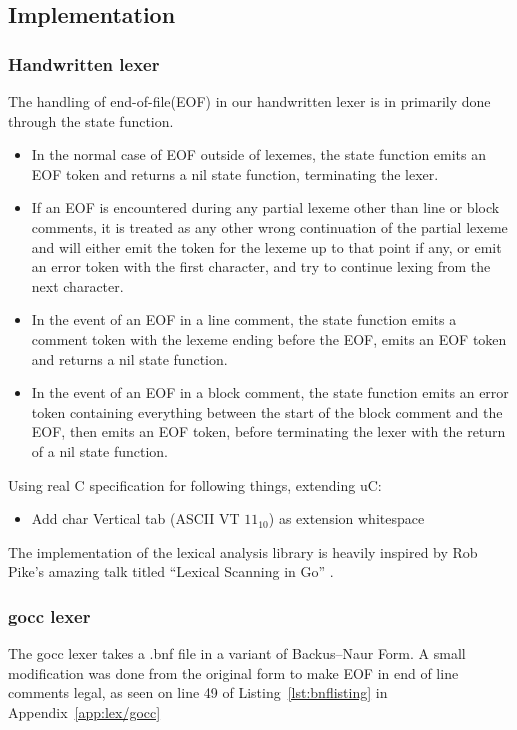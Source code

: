 \subsection{Implementation}

\subsubsection{Handwritten lexer}
The handling of end-of-file(EOF) in our handwritten lexer is in primarily done through the state function.
\begin{itemize}

\item In the normal case of EOF outside of lexemes, the state function emits an EOF token and returns a nil state function, terminating the lexer.

\item If an EOF is encountered during any partial lexeme other than line or block comments, it is treated as any other wrong continuation of the partial lexeme and will either emit the token for the lexeme up to that point if any, or emit an error token with the first character, and try to continue lexing from the next character.

\item In the event of an EOF in a line comment, the state function emits a comment token with the lexeme ending before the EOF, emits an EOF token and returns a nil state function.

\item In the event of an EOF in a block comment, the state function emits an error token containing everything between the start of the block comment and the EOF, then emits an EOF token, before terminating the lexer with the return of a nil state function.

\end{itemize}

Using real C specification for following things, extending uC:
\begin{itemize}
	\item Add char Vertical tab (ASCII VT $11_{10}$) as extension whitespace
\end{itemize}



The implementation of the lexical analysis library is heavily inspired by Rob Pike's amazing talk titled ``Lexical Scanning in Go'' \cite{lexical_scanning_in_go}.


\subsubsection{gocc lexer}
The gocc lexer takes a .bnf file in a variant of Backus–Naur Form.
A small modification was done from the original form to make EOF in end of line comments legal, as seen on line 49 of Listing~\ref{lst:bnflisting} in Appendix~\ref{app:lex/gocc}
